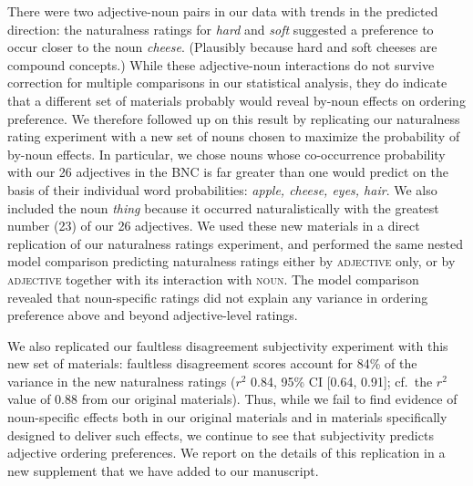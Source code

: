 \documentclass[12pt]{article}
\begin{document}
There were two adjective-noun pairs in our data with trends in the predicted direction: the naturalness ratings for \emph{hard} and \emph{soft} suggested a preference to occur closer to the noun \emph{cheese}. (Plausibly because hard and soft cheeses are compound concepts.) While these adjective-noun interactions do not survive correction for multiple comparisons in our statistical analysis, they do indicate that a different set of materials probably would reveal by-noun effects on ordering preference. We therefore followed up on this result by replicating our naturalness rating experiment with a new set of nouns chosen to maximize the probability of by-noun effects. In particular, we chose nouns whose co-occurrence probability with our 26 adjectives in the BNC is far greater than one would predict on the basis of their individual word probabilities: \emph{apple, cheese, eyes, hair}. We also included the noun \emph{thing} because it occurred naturalistically with the greatest number (23) of our 26 adjectives.
We used these new materials in a direct replication of our naturalness ratings experiment, and performed the same nested model comparison predicting naturalness ratings either by \textsc{adjective} only, or by \textsc{adjective} together with its interaction with \textsc{noun}. The model comparison revealed that noun-specific ratings did not explain any variance in ordering preference above and beyond adjective-level ratings.

We also replicated our faultless disagreement subjectivity experiment with this new set of materials: faultless disagreement scores account for 84\% of the variance in the new naturalness ratings ($r^2$ 0.84, 95\% CI [0.64,  0.91]; cf.~the $r^2$ value of 0.88 from our original materials). Thus, while we fail to find evidence of noun-specific effects both in our original materials and in materials specifically designed to deliver such effects, we continue to see that subjectivity predicts adjective ordering preferences. We report on the details of this replication in a new supplement that we have added to our manuscript.




\end{document}

